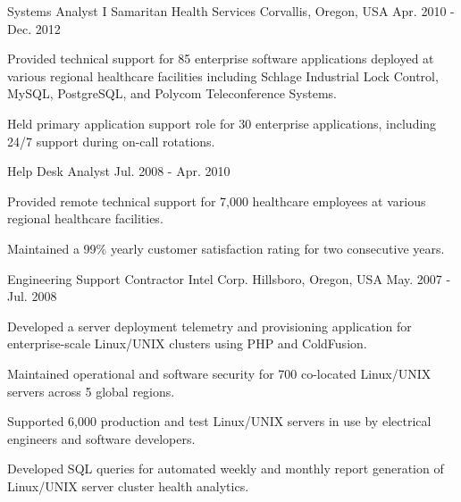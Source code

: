 \begin{cventries}
  \cventry
    {Systems Analyst I} %
    {Samaritan Health Services} %
    {Corvallis, Oregon, USA} %
    {Apr. 2010 - Dec. 2012} %
    {
      \begin{cvitems} %
        \item {Provided technical support for 85 enterprise software applications deployed at various regional healthcare facilities including Schlage Industrial Lock Control, MySQL, PostgreSQL, and Polycom Teleconference Systems.}
        \item {Held primary application support role for 30 enterprise applications, including 24/7 support during on-call rotations.}
      \end{cvitems}
    }
    
  \cventry
    {Help Desk Analyst} %
    {} %
    {} %
    {Jul. 2008 - Apr. 2010} %
    {
      \begin{cvitems} %
        \item {Provided remote technical support for 7,000 healthcare employees at various regional healthcare facilities.}
        \item {Maintained a 99\% yearly customer satisfaction rating for two consecutive years.}
      \end{cvitems}
    }
    
  \cventry
    {Engineering Support Contractor} %
    {Intel Corp.} %
    {Hillsboro, Oregon, USA} %
    {May. 2007 - Jul. 2008} %
    {
   	  \begin{cvitems} %
        \item {Developed a server deployment telemetry and provisioning application for enterprise-scale Linux/UNIX clusters using PHP and ColdFusion.}
        \item {Maintained operational and software security for 700 co-located Linux/UNIX servers across 5 global regions.}
        \item {Supported 6,000 production and test Linux/UNIX servers in use by electrical engineers and software developers.}
        \item {Developed SQL queries for automated weekly and monthly report generation of Linux/UNIX server cluster health analytics.}
      \end{cvitems}
    }

\end{cventries}
